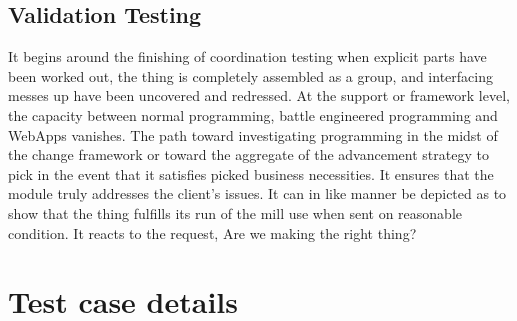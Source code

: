 \documentclass[oneside,12pt]{Classes/VTU}
\begin{document}
	\subsection{Validation Testing}
	It begins around the finishing of coordination testing when explicit parts have been worked out, the thing is completely assembled as a group, and interfacing messes up have been uncovered and redressed. At the support or framework level, the capacity between normal programming, battle engineered programming and WebApps vanishes. The path toward investigating programming in the midst of the change framework or toward the aggregate of the advancement strategy to pick in the event that it satisfies picked business necessities. It ensures that the module truly addresses the client's issues. It can in like manner be depicted as to show that the thing fulfills its run of the mill use when sent on reasonable condition. It reacts to the request, Are we making the right thing?
	
	\section{Test case details}
\end{document}
